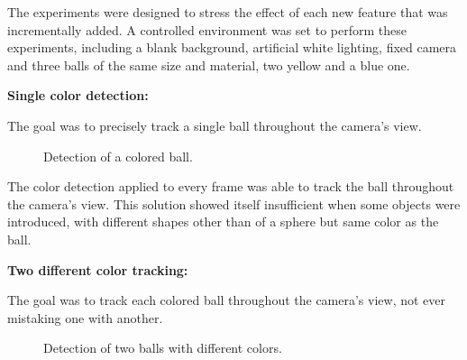 \documentclass[10pt,twocolumn,letterpaper]{article}
\begin{document}
  The experiments were designed to stress the effect of each new feature that
  was incrementally added. A controlled environment was set to perform these
  experiments, including a blank background, artificial white lighting, fixed
  camera and three balls of the same size and material, two yellow and a blue
  one.

  \bigbreak{}
  \textbf{Single color detection:}
  \bigbreak{}

  The goal was to precisely track a single ball throughout the camera's view.

  \begin{figure}[!h]
    \centering
    \setlength{\fboxsep}{1pt}
    \setlength{\fboxrule}{1pt}
    \caption{Detection of a colored ball.}\label{fig:single_color}
  \end{figure}

  The color detection applied to every frame was able to track the ball
  throughout the camera's view. This solution showed itself insufficient when
  some objects were introduced, with different shapes other than of a sphere but
  same color as the ball.

  \bigbreak{}
  \textbf{Two different color tracking:}
  \bigbreak{}

  The goal was to track each colored ball throughout the camera's view, not ever
  mistaking one with another.

  \begin{figure}[!h]
    \centering
    \setlength{\fboxsep}{1pt}
    \setlength{\fboxrule}{1pt}
    \caption{Detection of two balls with different colors.}\label{fig:diff_color}
  \end{figure}
\end{document}
